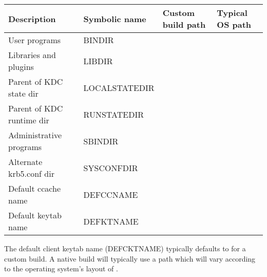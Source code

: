 \documentclass[letterpaper,10pt,english]{sphinxmanual}
\begin{document}
\begin{tabulary}{\linewidth}{|L|L|L|L|}
\hline
\textsf{\relax 
Description
} & \textsf{\relax 
Symbolic name
} & \textsf{\relax 
Custom build path
} & \textsf{\relax 
Typical OS path
}\\
\hline
User programs
 & 
BINDIR
 & 
 & 
\\
\hline
Libraries and plugins
 & 
LIBDIR
 & 
 & 
\\
\hline
Parent of KDC state dir
 & 
LOCALSTATEDIR
 & 
 & 
\\
\hline
Parent of KDC runtime dir
 & 
RUNSTATEDIR
 & 
 & 
\\
\hline
Administrative programs
 & 
SBINDIR
 & 
 & 
\\
\hline
Alternate krb5.conf dir
 & 
SYSCONFDIR
 & 
 & 
\\
\hline
Default ccache name
 & 
DEFCCNAME
 & 
 & 
\\
\hline
Default keytab name
 & 
DEFKTNAME
 & 
 & 
\\
\hline\end{tabulary}


The default client keytab name (DEFCKTNAME) typically defaults to
 for a custom
build.  A native build will typically use a path which will vary
according to the operating system's layout of .
\end{document}
